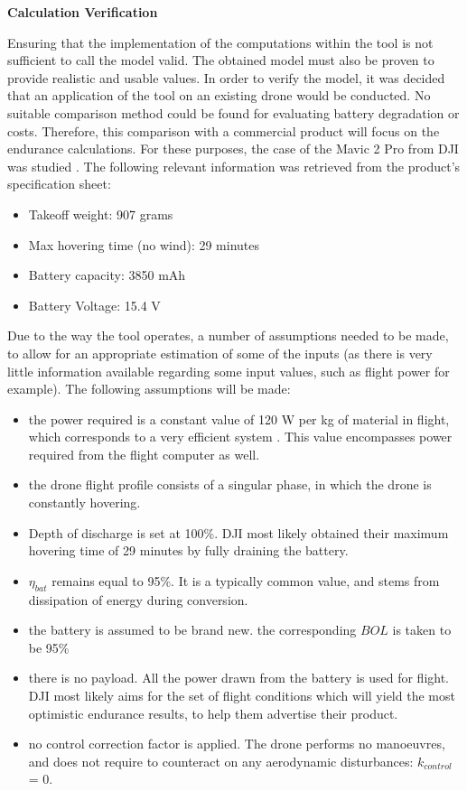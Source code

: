 \textbf{Calculation Verification}

Ensuring that the implementation of the computations within the tool is not sufficient to call the model valid. The obtained model must also be proven to provide realistic and usable values. In order to verify the model, it was decided that an application of the tool on an existing drone would be conducted. No suitable comparison method could be found for evaluating battery degradation or costs. Therefore, this comparison with a commercial product will focus on the endurance calculations.
For these purposes, the case of the Mavic 2 Pro from DJI was studied \cite{dji_official_mavic2pro}. The following relevant information was retrieved from the product's specification sheet:

\begin{itemize}[noitemsep]
\itemsep0em
    \item Takeoff weight: 907 grams
    \item Max hovering time (no wind): 29 minutes
    \item Battery capacity: 3850 mAh
    \item Battery Voltage: 15.4 V
\end{itemize}

Due to the way the tool operates, a number of assumptions needed to be made, to allow for an appropriate estimation of some of the inputs (as there is very little information available regarding some input values, such as flight power for example). The following assumptions will be made:

\begin{itemize}[noitemsep]
\itemsep0em
    \item the power required is a constant value of 120 W per kg of material in flight, which corresponds to a very efficient system \cite{szyk_2018}. This value encompasses power required from the flight computer as well.
    \item the drone flight profile consists of a singular phase, in which the drone is constantly hovering.
    \item Depth of discharge is set at 100\%. DJI most likely obtained their maximum hovering time of 29 minutes by fully draining the battery.
    \item $\eta_{\mathit{bat}}$ remains equal to 95\%. It is a typically common value, and stems from dissipation of energy during conversion.
    \item the battery is assumed to be brand new. the corresponding $BOL$ is taken to be 95\% 
    \item there is no payload. All the power drawn from the battery is used for flight. DJI most likely aims for the set of flight conditions which will yield the most optimistic endurance results, to help them advertise their product.
    \item no control correction factor is applied. The drone performs no manoeuvres, and does not require to counteract on any aerodynamic disturbances: $k_{\mathit{control}}$ = 0.
\end{itemize}

